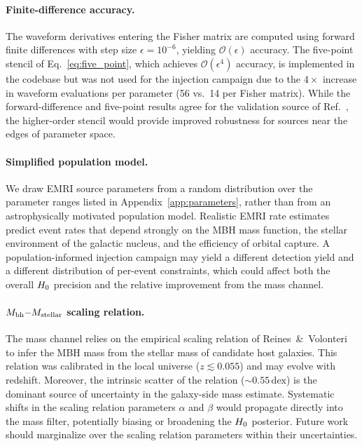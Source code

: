 \paragraph{Finite-difference accuracy.}
The waveform derivatives entering the Fisher matrix are computed using
forward finite differences with step size $\epsilon = 10^{-6}$,
yielding $\mathcal{O}(\epsilon)$ accuracy.  The five-point stencil of
Eq.~\eqref{eq:five_point}, which achieves $\mathcal{O}(\epsilon^4)$
accuracy, is implemented in the codebase but was not used for the
injection campaign due to the $4\times$ increase in waveform evaluations
per parameter (56 vs.\ 14 per Fisher matrix).  While the forward-difference
and five-point results agree for the validation source of
Ref.~\cite{Babak:2017tow}, the higher-order stencil would provide
improved robustness for sources near the edges of parameter space.

\paragraph{Simplified population model.}
We draw EMRI source parameters from a random distribution over the
parameter ranges listed in Appendix~\ref{app:parameters}, rather than
from an astrophysically motivated population model.  Realistic EMRI rate
estimates~\cite{Babak:2017tow} predict event rates that depend strongly
on the MBH mass function, the stellar environment of the galactic
nucleus, and the efficiency of orbital capture.  A population-informed
injection campaign may yield a different detection yield and a different
distribution of per-event constraints, which could affect both the
overall $H_0$ precision and the relative improvement from the mass
channel.

\paragraph{$M_\mathrm{bh}$--$M_\mathrm{stellar}$ scaling relation.}
The mass channel relies on the empirical scaling relation of
Reines~\&~Volonteri~\cite{Reines:2015moa} to infer the MBH mass from
the stellar mass of candidate host galaxies.  This relation was
calibrated in the local universe ($z \lesssim 0.055$) and may evolve
with redshift.  Moreover, the intrinsic scatter of the relation
($\sim 0.55\,\mathrm{dex}$) is the dominant source of uncertainty in
the galaxy-side mass estimate.  Systematic shifts in the scaling
relation parameters $\alpha$ and $\beta$ would propagate directly into
the mass filter, potentially biasing or broadening the $H_0$ posterior.
Future work should marginalize over the scaling relation parameters
within their uncertainties.

